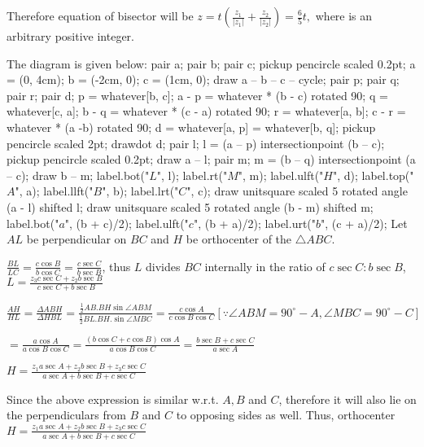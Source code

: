   Therefore equation of bisector will be $z = t\left(\frac{z_1}{|z_1|} + \frac{z_2}{|z_2|}\right) =
  \frac{6}{5}t,$ where is an arbitrary positive integer.
\item The diagram is given below:
  \startplacefigure[location={left, none}]
    \startMPcode
      pair a; pair b; pair c;
      pickup pencircle scaled 0.2pt;
      a = (0, 4cm); b = (-2cm, 0); c = (1cm, 0);
      draw a -- b -- c -- cycle;
      pair p; pair q; pair r; pair d;
      p = whatever[b, c]; a - p = whatever * (b - c) rotated 90;
      q = whatever[c, a]; b - q = whatever * (c - a) rotated 90;
      r = whatever[a, b]; c - r = whatever * (a -b) rotated 90;
      d = whatever[a, p] = whatever[b, q]; %
      pickup pencircle scaled 2pt;
      drawdot d;
      pair l;
      l = (a -- p) intersectionpoint  (b -- c);
      pickup pencircle scaled 0.2pt;
      draw a -- l;
      pair m;
      m = (b -- q) intersectionpoint  (a -- c);
      draw b -- m;
      label.bot("$L$", l);
      label.rt("$M$", m);
      label.ulft("$H$", d);
      label.top("$A$", a);
      label.llft("$B$", b);
      label.lrt("$C$", c);
      draw unitsquare scaled 5 rotated angle (a - l) shifted l;
      draw unitsquare scaled 5 rotated angle (b - m) shifted m;
      label.bot("$a$", (b + c)/2);
      label.ulft("$c$", (b + a)/2);
      label.urt("$b$", (c + a)/2);
    \stopMPcode
  \stopplacefigure
  Let $AL$ be perpendicular on $BC$ and $H$ be orthocenter of the $\triangle ABC$.

  $\frac{BL}{LC} = \frac{c\cos B}{b\cos C} = \frac{c\sec C}{b\sec B}$, thus $L$ divides $BC$ internally in the ratio of $c\sec
  C:b\sec B$,  $L = \frac{z_3c\sec C + z_2b\sec B}{c\sec C + b\sec B}$

  $\frac{AH}{HL} = \frac{\Delta ABH}{\Delta HBL} = \frac{\frac{1}{2}AB.BH\sin\angle
    ABM}{\frac{1}{2}BL.BH.\sin\angle MBC} = \frac{c\cos A}{c\cos B\cos C}[\because \angle ABM = 90^\circ -
    A, \angle MBC = 90^\circ - C]$

  $= \frac{a\cos A}{a\cos B\cos C} = \frac{(b\cos C + c\cos B)\cos A}{a\cos B\cos C} = \frac{b\sec B + c\sec C}{a\sec A}$

  $H = \frac{z_1a\sec A + z_2b\sec B + z_3c\sec C}{a\sec A + b\sec B + c\sec C}$

  Since the above expression is similar w.r.t. $A, B$ and $C$, therefore it will also lie on the perpendiculars from $B$ and $C$ to
  opposing sides as well.
  Thus, orthocenter $H = \frac{z_1a\sec A + z_2b\sec B + z_3c\sec C}{a\sec A + b\sec B + c\sec C}$

